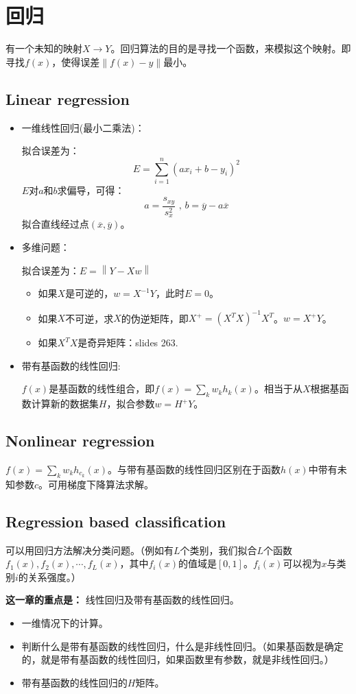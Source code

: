 \documentclass[12pt, a4paper, oneside]{ctexart}
\newenvironment{zd}{\begin{shaded}\par\noindent\textbf{这一章的重点是：}}{\end{shaded}\par}
\begin{document}
\section{回归}
有一个未知的映射$X\rightarrow Y$。回归算法的目的是寻找一个函数，来模拟这个映射。即寻找$f(x)$，使得误差$\left\|f(x)-y\right\|$最小。
\subsection{Linear regression}
\begin{itemize}
    \item 一维线性回归(最小二乘法)：
    
    拟合误差为：$$E=\sum_{i=1}^n{(ax_i+b-y_i)}^2$$
    $E$对$a$和$b$求偏导，可得：$$a=\frac{s_{xy}}{s^2_x}\text{ , }b=\overline{y}-a \overline{x}$$
    拟合直线经过点$(\overline{x}, \overline{y})$。

    \item 多维问题：
    
    拟合误差为：$E=\left\|Y-Xw\right\|$
    \begin{itemize}
        \item 如果$X$是可逆的，$w=X^{-1}Y$，此时$E=0$。
        \item 如果$X$不可逆，求$X$的伪逆矩阵，即$X^+={(X^TX)}^{-1}X^T$。$w=X^{+}Y$。
        \item 如果$X^TX$是奇异矩阵：slides 263.
    \end{itemize}

    \item 带有基函数的线性回归:
    
    $f(x)$是基函数的线性组合，即$f(x)=\sum_kw_kh_k(x)$。相当于从$X$根据基函数计算新的数据集$H$，拟合参数$w=H^+Y$。
    
\end{itemize}
\subsection{Nonlinear regression}
$f(x)=\sum_kw_kh_{c_k}(x)$。与带有基函数的线性回归区别在于函数$h(x)$中带有未知参数$c$。可用梯度下降算法求解。
\subsection{Regression based classification}
可以用回归方法解决分类问题。（例如有$L$个类别，我们拟合$L$个函数$f_1(x),f_2(x),\cdots,f_L(x)$，其中$f_i(x)$的值域是$[0,1]$。$f_i(x)$可以视为$x$与类别$i$的关系强度。）
\begin{zd}
    线性回归及带有基函数的线性回归。
    \begin{itemize}
        \item 一维情况下的计算。
        \item 判断什么是带有基函数的线性回归，什么是非线性回归。（如果基函数是确定的，就是带有基函数的线性回归，如果函数里有参数，就是非线性回归。）
        \item 带有基函数的线性回归的$H$矩阵。
    \end{itemize}
\end{zd}
\end{document}
